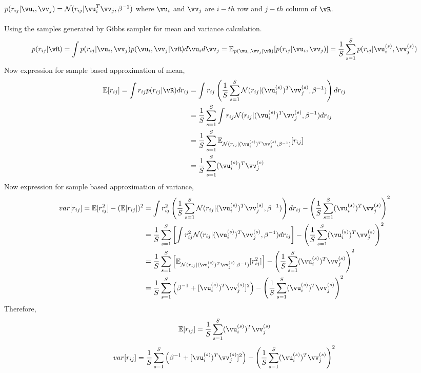 \documentclass[a4paper,11pt]{article}
\begin{document}
\begin{pmisolution}
\(p(r_{ij}|\vu_i,\vv_j) = \mathcal{N}(r_{ij}|\vu_i^T\vv_j,\beta^{-1})\) where \(\vu_i\) and \(\vv_j\) are \(i-th\) row and \(j-th\) column of \(\vR\).\\\\
Using the samples generated by Gibbs sampler for mean and variance calculation.
\[p(r_{ij}|\vR) = \int p(r_{ij}|\vu_i,\vv_j)p(\vu_i,\vv_j|\vR)d\vu_id\vv_j = \mathbb{E}_{p(\vu_i,\vv_j|\vR)}[p(r_{ij}|\vu_i,\vv_j)] =\frac{1}{S} \sum_{s=1}^{S} p(r_{ij}|\vu_i^{(s)},\vv_j^{(s)})\]
Now expression for sample based approximation of mean,
\begin{align*}
    \mathbb{E}[r_{ij}] = \int r_{ij} p(r_{ij}|\vR)dr_{ij} &= \int r_{ij} \left(\frac{1}{S}\sum_{s=1}^{S} \mathcal{N}(r_{ij}|(\vu_i^{(s)})^T\vv_j^{(s)},\beta^{-1})\right)dr_{ij}\\
    & = \frac{1}{S}\sum_{s=1}^{S} \int  r_{ij}\mathcal{N}(r_{ij}|(\vu_i^{(s)})^T\vv_j^{(s)},\beta^{-1})dr_{ij}\\
    &= \frac{1}{S}\sum_{s=1}^{S} \mathbb{E}_{\mathcal{N}(r_{ij}|(\vu_i^{(s)})^T\vv_j^{(s)},\beta^{-1})}[r_{ij}]\\
    &= \frac{1}{S}\sum_{s=1}^{S} (\vu_i^{(s)})^T\vv_j^{(s)}
\end{align*}
Now expression for sample based approximation of variance,
\begin{align*}
    var[r_{ij}] = \mathbb{E}[r_{ij}^2] - (\mathbb{E}[r_{ij}])^2 &= \int r_{ij}^2 \left(\frac{1}{S}\sum_{s=1}^{S} \mathcal{N}(r_{ij}|(\vu_i^{(s)})^T\vv_j^{(s)},\beta^{-1})\right)dr_{ij} - \left( \frac{1}{S}\sum_{s=1}^{S} (\vu_i^{(s)})^T\vv_j^{(s)}\right)^2\\
    &= \frac{1}{S}\sum_{s=1}^{S} \left[\int r_{ij}^2 \mathcal{N}(r_{ij}|(\vu_i^{(s)})^T\vv_j^{(s)},\beta^{-1})dr_{ij} \right] - \left( \frac{1}{S}\sum_{s=1}^{S} (\vu_i^{(s)})^T\vv_j^{(s)}\right)^2\\
    &= \frac{1}{S}\sum_{s=1}^{S} \left[ \mathbb{E}_{\mathcal{N}(r_{ij}|(\vu_i^{(s)})^T\vv_j^{(s)},\beta^{-1})}[r_{ij}^2]\right] - \left( \frac{1}{S}\sum_{s=1}^{S} (\vu_i^{(s)})^T\vv_j^{(s)}\right)^2\\
    &= \frac{1}{S}\sum_{s=1}^{S} \left( \beta^{-1} + [\vu_i^{(s)})^T\vv_j^{(s)}]^2 \right) - \left( \frac{1}{S}\sum_{s=1}^{S} (\vu_i^{(s)})^T\vv_j^{(s)}\right)^2
\end{align*}
Therefore,
\[\mathbb{E}[r_{ij}] = \frac{1}{S}\sum_{s=1}^{S} (\vu_i^{(s)})^T\vv_j^{(s)}\]
\[ var[r_{ij}] = \frac{1}{S}\sum_{s=1}^{S} \left( \beta^{-1} + [\vu_i^{(s)})^T\vv_j^{(s)}]^2 \right) - \left( \frac{1}{S}\sum_{s=1}^{S} (\vu_i^{(s)})^T\vv_j^{(s)}\right)^2\]
\end{pmisolution}
\end{document}

